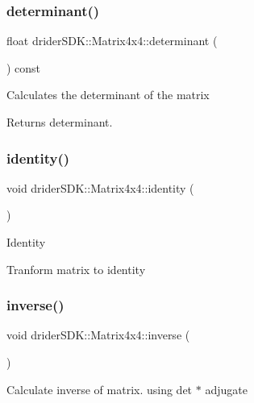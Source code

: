 \subsubsection{\texorpdfstring{determinant()}{determinant()}}
{\footnotesize\ttfamily float drider\+S\+D\+K\+::\+Matrix4x4\+::determinant (\begin{DoxyParamCaption}{ }\end{DoxyParamCaption}) const}

Calculates the determinant of the matrix

\begin{DoxyReturn}{Returns}
determinant. 
\end{DoxyReturn}
\mbox{\label{classdrider_s_d_k_1_1_matrix4x4_a56ab21663e69a6d5fc85ad9f5458765e}} 
\subsubsection{\texorpdfstring{identity()}{identity()}}
{\footnotesize\ttfamily void drider\+S\+D\+K\+::\+Matrix4x4\+::identity (\begin{DoxyParamCaption}{ }\end{DoxyParamCaption})}

Identity

Tranform matrix to identity \mbox{\label{classdrider_s_d_k_1_1_matrix4x4_aeca61e0c536625a96ad40b693604d40a}} 
\subsubsection{\texorpdfstring{inverse()}{inverse()}}
{\footnotesize\ttfamily void drider\+S\+D\+K\+::\+Matrix4x4\+::inverse (\begin{DoxyParamCaption}{ }\end{DoxyParamCaption})}

Calculate inverse of matrix. using det $\ast$ adjugate \mbox{\label{classdrider_s_d_k_1_1_matrix4x4_a646a2c43fc8c748fd58e5d9b707b1d27}} 
